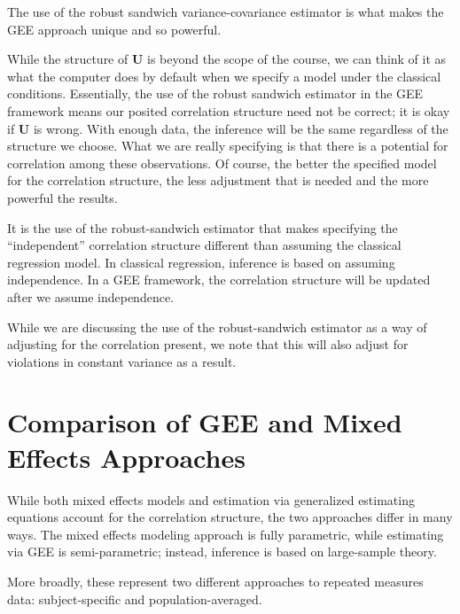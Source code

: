 \documentclass[
]{book}
\theoremstyle{plain}
\theoremstyle{mydefn}
\theoremstyle{myexmpl}
\theoremstyle{remark}
\begin{document}
\begin{rmdkeyidea}
The use of the robust sandwich variance-covariance estimator is what makes the GEE approach unique and so powerful.
\end{rmdkeyidea}

While the structure of \(\bm{U}\) is beyond the scope of the course, we can think of it as what the computer does by default when we specify a model under the classical conditions. Essentially, the use of the robust sandwich estimator in the GEE framework means our posited correlation structure need not be correct; it is okay if \(\bm{U}\) is wrong. With enough data, the inference will be the same regardless of the structure we choose. What we are really specifying is that there is a potential for correlation among these observations. Of course, the better the specified model for the correlation structure, the less adjustment that is needed and the more powerful the results.

\begin{rmdtip}
It is the use of the robust-sandwich estimator that makes specifying the ``independent'' correlation structure different than assuming the classical regression model. In classical regression, inference is based on assuming independence. In a GEE framework, the correlation structure will be updated after we assume independence.
\end{rmdtip}

\begin{rmdtip}
While we are discussing the use of the robust-sandwich estimator as a way of adjusting for the correlation present, we note that this will also adjust for violations in constant variance as a result.
\end{rmdtip}

\hypertarget{comparison-of-gee-and-mixed-effects-approaches}{%
\section{Comparison of GEE and Mixed Effects Approaches}\label{comparison-of-gee-and-mixed-effects-approaches}}

While both mixed effects models and estimation via generalized estimating equations account for the correlation structure, the two approaches differ in many ways. The mixed effects modeling approach is fully parametric, while estimating via GEE is semi-parametric; instead, inference is based on large-sample theory.

More broadly, these represent two different approaches to repeated measures data: subject-specific and population-averaged.
\end{document}
